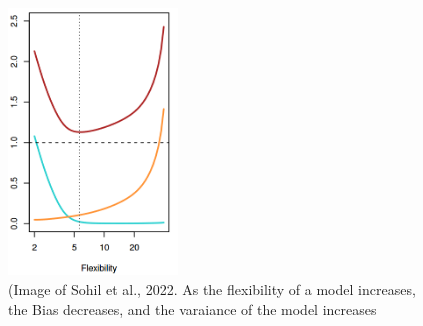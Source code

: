 \begin{figure}[h]
\label{MSEVarianceBias}
\caption{  
(Image of Sohil et al., 2022. As the flexibility of a model increases, the Bias decreases, and the varaiance of the model increases}
\centering
\includegraphics[width=0.4\textwidth]{MSEdependsonVarianceandBias}
\end{figure}

